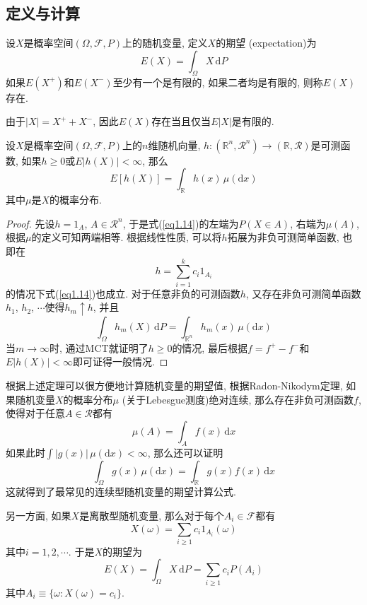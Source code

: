 \documentclass[cn, 12pt, math=mtpro2, bibstyle=apa, blue, twocol]{elegantbook}
\newcommand{\F}{\mathcal{F}}
\newcommand{\R}{\mathbb{R}}
\begin{document}
\subsection{定义与计算}
\begin{definition}
设$X$是概率空间$(\Omega,\F,P)$上的随机变量, 定义$X$的期望 (expectation)为
$$E(X)=\int_{\Omega}X\,\text{d}P$$
如果$E(X^+)$和$E(X^-)$至少有一个是有限的, 如果二者均是有限的, 则称$E(X)$存在.
\end{definition}
\begin{remark}
由于$|X|=X^++X^-$, 因此$E(X)$存在当且仅当$E|X|$是有限的.
\end{remark}
\begin{theorem}
  设$X$是概率空间$(\Omega,\F,P)$上的$n$维随机向量, $h:(\R^n,\mathcal{R}^n)\to(\R,\mathcal{R})$是可测函数, 如果$h\geq 0$或$E|h(X)|<\infty$, 那么
\begin{equation}\label{eq1.14}
  E[h(X)]=\int_{\R}h(x)\,\mu(\text{d}x)
\end{equation}
其中$\mu$是$X$的概率分布.
\end{theorem}
\begin{proof}
  先设$h=1_A$, $A\in\mathcal{R}^n$, 于是式(\ref{eq1.14})的左端为$P(X\in A)$, 右端为$\mu(A)$, 根据$\mu$的定义可知两端相等. 根据线性性质, 可以将$h$拓展为非负可测简单函数, 也即在
  $$h=\sum_{i=1}^{k}c_i1_{A_i}$$
  的情况下式(\ref{eq1.14})也成立. 对于任意非负的可测函数$h$, 又存在非负可测简单函数$h_1$, $h_2$, $\cdots$使得$h_m\uparrow h$, 并且
  $$\int_\Omega h_m(X)\,\text{d}P=\int_{\R^n} h_m(x)\,\mu(\text{d}x)$$
  当$m\to\infty$时, 通过MCT就证明了$h\geq0$的情况, 最后根据$f=f^+-f^-$和$E|h(X)|<\infty$即可证得一般情况.

\end{proof}
根据上述定理可以很方便地计算随机变量的期望值, 根据Radon-Nikodym定理, 如果随机变量$X$的概率分布$\mu$ (关于Lebesgue测度)绝对连续, 那么存在非负可测函数$f$, 使得对于任意$A\in\mathcal{R}$都有
$$\mu(A)=\int_Af(x)\,\text{d}x$$
如果此时$\int|g(x)|\,\mu(\text{d}x)<\infty$, 那么还可以证明
\begin{equation}\label{eq1.23}
  \int_\Omega g(x)\,\mu(\text{d}x)=\int_{\R}g(x)f(x)\,\text{d}x
\end{equation}
这就得到了最常见的连续型随机变量的期望计算公式.

另一方面, 如果$X$是离散型随机变量, 那么对于每个$A_i\in\F$都有
$$X(\omega)=\sum_{i\geq 1} c_i1_{A_i}(\omega)$$
其中$i=1,2,\cdots$. 于是$X$的期望为
$$E(X)=\int_\Omega X\,\text{d}P=\sum_{i\ge1}c_iP(A_i)$$
其中$A_i\equiv \{\omega: X(\omega)=c_i\}$.
\end{document}

